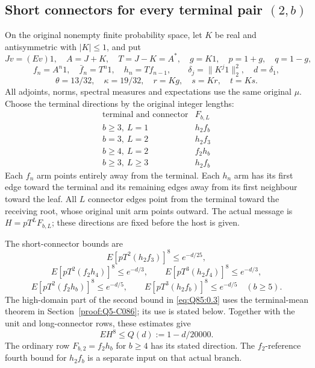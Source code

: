 \subsection{Short connectors for every terminal pair \((2,\allowbreak b)\)}\label{proof:Q5-C085}
On the original nonempty finite probability space, let \(K\) be real and antisymmetric with \(|K|\le\allowbreak 1\), and put
\[
 Jv=(Ev)1,\quad A=J+K,\quad T=J-K=A^*,\quad
 g=K1,\quad p=1+g,\quad q=1-g,
\]
\[
 f_n=A^n1,\quad \bar f_n=T^n1,\quad h_n=Tf_{n-1},\qquad
 \delta_j=\|K^j1\|_2^2,\quad d=\delta_1,
\]
\[
 \theta=13/32,\quad\kappa=19/32,\quad
 r=Kg,\quad s=Kr,\quad t=Ks.
\]
All adjoints, norms, spectral measures and expectations use the same original \(\mu\).
Choose the terminal directions by the original integer lengths:
\[
\begin{array}{c|c}
\text{terminal and connector}&F_{b,L}\\ \hline
b\ge3,\ L=1&h_2f_b\\
b=3,\ L=2&h_2f_3\\
b\ge4,\ L=2&f_2h_b\\
b\ge3,\ L\ge3&h_2f_b
\end{array}
\]
Each \(f_n\) arm points entirely away from the terminal.
Each \(h_n\) arm has its first edge toward the terminal and its remaining edges away from its first neighbour toward the leaf.
All \(L\) connector edges point from the terminal toward the receiving root, whose original unit arm points outward.
The actual message is \(H=\allowbreak pT^LF_{b,\allowbreak L}\); these directions are fixed before the host is given.

The short-connector bounds are
\[
 E[pT^2(h_2f_3)]^8\le e^{-d/25},                         \tag{Q85.0.1}\label{eq:Q85:0.1}
\]
\[
 E[pT^2(f_2h_4)]^8\le e^{-d/3},\qquad
 E[pT^3(h_2f_4)]^8\le e^{-d/3},                        \tag{Q85.0.2}\label{eq:Q85:0.2}
\]
\[
 E[pT^2(f_2h_b)]^8\le e^{-d/5},\qquad
 E[pT^3(h_2f_b)]^8\le e^{-d/5}\quad(b\ge5).             \tag{Q85.0.3}\label{eq:Q85:0.3}
\]
The high-domain part of the second bound in \eqref{eq:Q85:0.3} uses the terminal-mean theorem in Section~\ref{proof:Q5-C086}; its use is stated below.
Together with the unit and long-connector rows, these estimates give
\[
 E H^8\le Q(d):=1-d/20000.                              \tag{Q85.0.4}\label{eq:Q85:0.4}
\]
The ordinary row \(F_{b,\allowbreak 2}=\allowbreak f_2h_b\) for \(b\ge\allowbreak 4\) has its stated direction.
The \(f_2\)-reference fourth bound for \(h_2f_b\) is a separate input on that actual branch.

